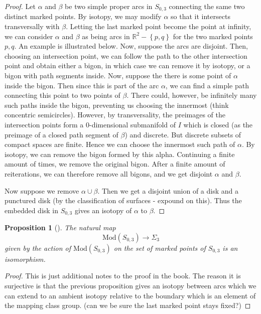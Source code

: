 \documentclass[reqno]{amsart}
\newtheorem{proposition}[theorem]{Proposition}
\theoremstyle{definition}
\theoremstyle{remark}
\newcommand{\Mod}{{\mathrm{Mod}}}
\begin{document}
\begin{proof}
    Let $\alpha$ and $\beta$ be two simple proper arcs in
    $S_{0,3}$ connecting the same two distinct marked points.
    By isotopy, we may modify $\alpha$ so that
    it intersects transversally with $\beta$.
    Letting the last marked point become the point at infinity,
    we can consider $\alpha$ and $\beta$ as being
    arcs in $\mathbb{R}^2 - \left\{ p,q \right\} $ for
    the two marked points $p,q$.
    An example is illustrated below.
    Now, suppose the arcs are disjoint.
    Then, choosing an intersection point, we can follow
    the path to the other intersection point and obtain
    either a bigon, in which case we can remove it by isotopy,
    or a bigon with path segments inside.
    Now, suppose
    the there is some point of $\alpha$ inside the bigon.
    Then since this is part of the arc $\alpha$, we can find
    a simple path connecting this point to two points
    of $\beta$. There could, however, be infinitely many
    such paths inside the bigon, preventing us choosing the
    innermost (think concentric semicircles).
    However, by transversality, the preimages of the 
    intersection points
    form a $0$-dimensional submanifold of $I$ which is closed
    (as the preimage of a closed path segment of $ \beta$)
    and discrete.
    But discrete subsets of compact spaces are finite. Hence
    we can choose the innermost such path of $ \alpha$.
    By isotopy, we can remove the bigon formed by  this alpha.
    Continuing a finite amount of times, we remove the original
    bigon. After a finite amount of reiterations, we can
    therefore remove all bigons, and we get
    disjoint $ \alpha$ and $\beta$.

    Now suppose we remove $\alpha \cup  \beta$. Then
    we get a disjoint union of a disk and a punctured
    disk (by the classification of surfaces - expound on this).
    Thus the embedded disk in $S_{0,3}$ gives an isotopy
    of $\alpha$ to $\beta$.
\end{proof}
 



\begin{proposition}[]
    The natural map
    \[
    \Mod\left( S_{0,3} \right) \to \Sigma_{3}
    \] 
    given by the action of $\Mod\left( S_{0,3} \right) $ on the
    set of marked points of $S_{0,3}$ is an isomorphism.
\end{proposition}

\begin{proof}
    This is just additional notes to the proof in the book.
    The reason it is surjective is that the previous proposition
    gives an isotopy between arcs which we can extend to
    an ambient isotopy relative to the boundary which
    is an element of the mapping class group. (can we
    be sure the last marked point stays fixed?)
\end{proof}
\end{document}
